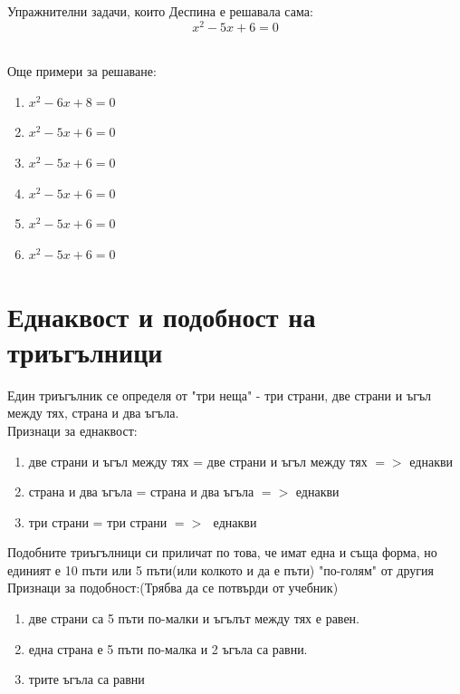 \documentclass{article}
\begin{document}
	 \vspace{1cm}
	 
	 
	
	Упражнителни задачи, които Деспина е решавала сама: \\
	
		$$x^2 - 5x + 6 = 0$$  \\
		
		
		\vspace{3cm}
		
		Още примери за решаване: \\
		\begin{enumerate}
			\item $x^2 - 6x + 8 = 0$
			\item $x^2 - 5x + 6 = 0$
			\item $x^2 - 5x + 6 = 0$
			\item $x^2 - 5x + 6 = 0$
			\item $x^2 - 5x + 6 = 0$
			\item $x^2 - 5x + 6 = 0$
		\end{enumerate}

		
		
		\newpage
	\section{Еднаквост и подобност на триъгълници}	
	
	Един триъгълник се определя от "три неща" - 
	три страни, две страни и ъгъл между тях, страна и два ъгъла. \\
	
	
	Признаци за еднаквост:
	\begin{enumerate}
		\item две страни и ъгъл между тях = две страни и ъгъл между тях $=>$  еднакви
		\item страна и два ъгъла = страна и два ъгъла $=>$  еднакви
		\item три страни = три страни $=>$ $ $ еднакви
	\end{enumerate}

	\vspace{1cm}
	
	
	Подобните триъгълници си приличат по това, че имат една и съща форма, но единият е 10 пъти или 5 пъти(или колкото и да е пъти) "по-голям" от другия \\
	
		Признаци за подобност:(Трябва да се потвърди от учебник)
	\begin{enumerate}
		\item две страни са 5 пъти по-малки и ъгълът между тях е равен.
		\item една страна е 5 пъти по-малка и 2 ъгъла са равни.
 		\item  трите ъгъла са равни
 	\end{enumerate}
	
\end{document}
